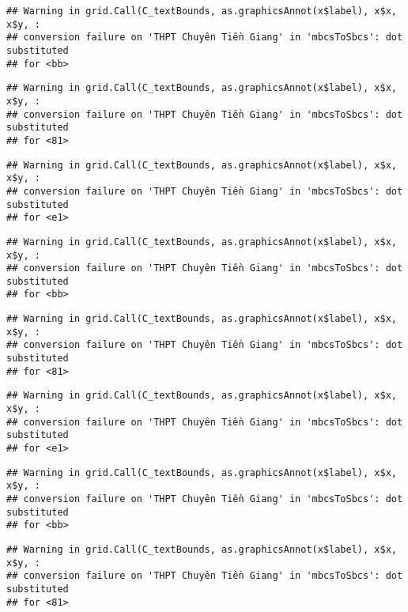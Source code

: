\documentclass[
]{article}
\begin{document}
\begin{verbatim}
## Warning in grid.Call(C_textBounds, as.graphicsAnnot(x$label), x$x, x$y, :
## conversion failure on 'THPT Chuyên Tiền Giang' in 'mbcsToSbcs': dot substituted
## for <bb>
\end{verbatim}

\begin{verbatim}
## Warning in grid.Call(C_textBounds, as.graphicsAnnot(x$label), x$x, x$y, :
## conversion failure on 'THPT Chuyên Tiền Giang' in 'mbcsToSbcs': dot substituted
## for <81>
\end{verbatim}

\begin{verbatim}
## Warning in grid.Call(C_textBounds, as.graphicsAnnot(x$label), x$x, x$y, :
## conversion failure on 'THPT Chuyên Tiền Giang' in 'mbcsToSbcs': dot substituted
## for <e1>
\end{verbatim}

\begin{verbatim}
## Warning in grid.Call(C_textBounds, as.graphicsAnnot(x$label), x$x, x$y, :
## conversion failure on 'THPT Chuyên Tiền Giang' in 'mbcsToSbcs': dot substituted
## for <bb>
\end{verbatim}

\begin{verbatim}
## Warning in grid.Call(C_textBounds, as.graphicsAnnot(x$label), x$x, x$y, :
## conversion failure on 'THPT Chuyên Tiền Giang' in 'mbcsToSbcs': dot substituted
## for <81>
\end{verbatim}

\begin{verbatim}
## Warning in grid.Call(C_textBounds, as.graphicsAnnot(x$label), x$x, x$y, :
## conversion failure on 'THPT Chuyên Tiền Giang' in 'mbcsToSbcs': dot substituted
## for <e1>
\end{verbatim}

\begin{verbatim}
## Warning in grid.Call(C_textBounds, as.graphicsAnnot(x$label), x$x, x$y, :
## conversion failure on 'THPT Chuyên Tiền Giang' in 'mbcsToSbcs': dot substituted
## for <bb>
\end{verbatim}

\begin{verbatim}
## Warning in grid.Call(C_textBounds, as.graphicsAnnot(x$label), x$x, x$y, :
## conversion failure on 'THPT Chuyên Tiền Giang' in 'mbcsToSbcs': dot substituted
## for <81>
\end{verbatim}
\end{document}
